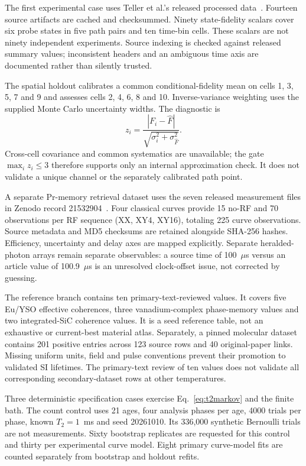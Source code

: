 \documentclass[11pt,a4paper]{article}
\begin{document}
The first experimental case uses Teller et al.'s released processed data~\cite{teller,tellerdata}. Fourteen source artifacts are cached and checksummed. Ninety state-fidelity scalars cover six probe states in five path pairs and ten time-bin cells. These scalars are not ninety independent experiments. Source indexing is checked against released summary values; inconsistent headers and an ambiguous time axis are documented rather than silently trusted.

The spatial holdout calibrates a common conditional-fidelity mean on cells 1, 3, 5, 7 and 9 and assesses cells 2, 4, 6, 8 and 10. Inverse-variance weighting uses the supplied Monte Carlo uncertainty widths. The diagnostic is
\begin{equation}
z_i=\frac{|F_i-\widehat F|}{\sqrt{\sigma_i^2+\sigma_{\widehat F}^2}}.
\end{equation}
Cross-cell covariance and common systematics are unavailable; the gate $\max_i z_i\leq3$ therefore supports only an internal approximation check. It does not validate a unique channel or the separately calibrated path point.

A separate Pr-memory retrieval dataset uses the seven released measurement files in Zenodo record 21532904~\cite{rodriguez,prdata}. Four classical curves provide 15 no-RF and 70 observations per RF sequence (XX, XY4, XY16), totaling 225 curve observations. Source metadata and MD5 checksums are retained alongside SHA-256 hashes. Efficiency, uncertainty and delay axes are mapped explicitly. Separate heralded-photon arrays remain separate observables: a source time of 100~$\mu$s versus an article value of 100.9~$\mu$s is an unresolved clock-offset issue, not corrected by guessing.

The reference branch contains ten primary-text-reviewed values. It covers five Eu/YSO effective coherences, three vanadium-complex phase-memory values and two integrated-SiC coherence values. It is a seed reference table, not an exhaustive or current-best material atlas. Separately, a pinned molecular dataset~\cite{mtd} contains 201 positive entries across 123 source rows and 40 original-paper links. Missing uniform units, field and pulse conventions prevent their promotion to validated SI lifetimes. The primary-text review of ten values does not validate all corresponding secondary-dataset rows at other temperatures.

Three deterministic specification cases exercise Eq.~\eqref{eq:t2markov} and the finite bath. The count control uses 21 ages, four analysis phases per age, 4000 trials per phase, known $T_2=1$~ms and seed 20261010. Its 336,000 synthetic Bernoulli trials are not measurements. Sixty bootstrap replicates are requested for this control and thirty per experimental curve model. Eight primary curve-model fits are counted separately from bootstrap and holdout refits.
\end{document}
